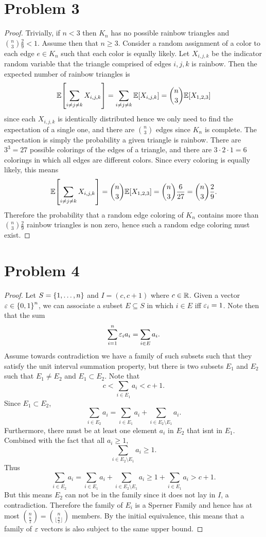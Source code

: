 \documentclass{eeleyes}
\begin{document}
\section*{Problem 3}
\begin{proof}
    Trivially, if $n < 3$ then $K_n$ has no possible rainbow triangles and $\binom{n}{3} \frac{2}{9} < 1$. Assume then that $n \geq 3$. Consider a random assignment of a color to each edge $e \in K_n$ such that each color is equally likely. Let $X_{i,j,k}$ be the indicator random variable that the triangle comprised of edges $i,j,k$ is rainbow. Then the expected number of rainbow triangles is
    \[
        \mathbb{E}\qty[\sum_{i \neq j \neq k} X_{i,j,k}] = \sum_{i \neq j \neq k} \mathbb{E}\qty[X_{i,j,k}] = \binom{n}{3} \mathbb{E}\qty[X_{1,2,3}]
    \]
    since each $X_{i,j,k}$ is identically distributed hence we only need to find the expectation of a single one, and there are $\binom{n}{3}$ edges since $K_n$ is complete. The expectation is simply the probability a given triangle is rainbow. There are $3^3 = 27$ possible colorings of the edges of a triangle, and there are $3 \cdot 2 \cdot 1 = 6$ colorings in which all edges are different colors. Since every coloring is equally likely, this means
    \[
        \mathbb{E}\qty[\sum_{i \neq j \neq k} X_{i,j,k}] = \binom{n}{3} \mathbb{E}\qty[X_{1,2,3}] = \binom{n}{3} \frac{6}{27} = \binom{n}{3} \frac{2}{9}
    .\]
    Therefore the probability that a random edge coloring of $K_n$ contains more than $\binom{n}{3} \frac{2}{9}$ rainbow triangles is non zero, hence such a random edge coloring must exist.
\end{proof}

\section*{Problem 4}
\begin{proof}
    Let $S = \qty{1, \ldots, n}$ and $I = (c, c+1)$ where $c \in \mathbb{R}$. Given a vector $\varepsilon \in \qty{0,1}^n$, we can associate a subset $E \subseteq S$ in which $i \in E$ iff $\varepsilon_i = 1$. Note then that the sum
    \[
        \sum_{i=1}^n \varepsilon_i a_i = \sum_{i \in E} a_i
    .\]
    Assume towards contradiction we have a family of such subsets such that they satisfy the unit interval summation property, but there is two subsets $E_1$ and $E_2$ such that $E_1 \neq E_2$ and $E_1 \subset E_2$. Note that
    \[
        c < \sum_{i \in E_1} a_i < c + 1
    .\]
    Since $E_1 \subset E_2$,
    \[
        \sum_{i \in E_2} a_i = \sum_{i \in E_1} a_i + \sum_{i \in E_2 \setminus E_1} a_i
    .\]
    Furthermore, there must be at least one element $a_i$ in $E_2$ that isnt in $E_1$. Combined with the fact that all $a_i \geq 1$,
    \[
        \sum_{i \in E_2 \setminus E_1} a_i \geq 1
    .\]
    Thus
    \[
        \sum_{i \in E_2} a_i = \sum_{i \in E_1} a_i + \sum_{i \in E_2 \setminus E_1} a_i \geq 1 + \sum_{i \in E_1} a_i > c + 1
    .\]
    But this means $E_2$ can not be in the family since it does not lay in $I$, a contradiction. Therefore the family of $E_i$ is a Sperner Family and hence has at most $\binom{n}{\frac{n}{2}} = \binom{n}{\lfloor \frac{n}{2} \rfloor}$ members. By the initial equivalence, this means that a family of $\varepsilon$ vectors is also subject to the same upper bound.
\end{proof}
\end{document}
